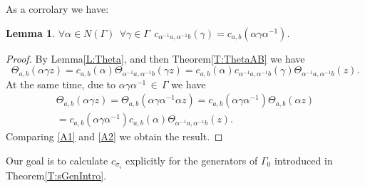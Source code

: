 \documentclass[]{amsart}
\numberwithin{equation}{section}
\newtheorem{lemma}[theorem]{Lemma}
\begin{document}
 As a corrolary we have: 
 \begin{lemma}\label{L:cc}
$\forall \alpha \in N(\Gamma)\ \ \forall \gamma\in \Gamma\ \ 
c_{\alpha^{-1}a, \alpha^{-1}b} (\gamma) = c_{a,b}(\alpha \gamma \alpha^{-1})$.
\end{lemma}
\begin{proof}
By Lemma\;\ref{L:Theta},  and then Theorem\;\ref{T:ThetaAB} we have
\begin{equation}\label{A1}
\Theta_{a,b}(\alpha \gamma z) = c_{a,b}(\alpha) \Theta_{\alpha^{-1}a, \alpha^{-1}b}( \gamma z)
= c_{a,b}(\alpha) c_{\alpha^{-1}a, \alpha^{-1}b} (\gamma) 
\Theta_{\alpha^{-1}a, \alpha ^{-1} b}(z).
\end{equation}
At the same time, due to $\alpha \gamma \alpha^{-1} \,{\in}\,\Gamma$ we have
\begin{multline}\label{A2}
\Theta_{a,b}(\alpha \gamma z) = \Theta_{a,b}(\alpha \gamma \alpha^{-1} \alpha z)
= c_{a,b}(\alpha \gamma \alpha^{-1}) \Theta_{a,b}(\alpha z) \\
= c_{a,b}(\alpha \gamma \alpha^{-1}) c_{a,b}(\alpha) \Theta_{\alpha^{-1}a, \alpha^{-1}b}(z).
\end{multline}
Comparing \eqref{A1} and \eqref{A2} we obtain the result.
\end{proof}

Our goal is to calculate $c_{\sigma_i}$ explicitly for the generators of $\Gamma_0$
introduced in Theorem\;\ref{T:sGenIntro}.
\end{document}
